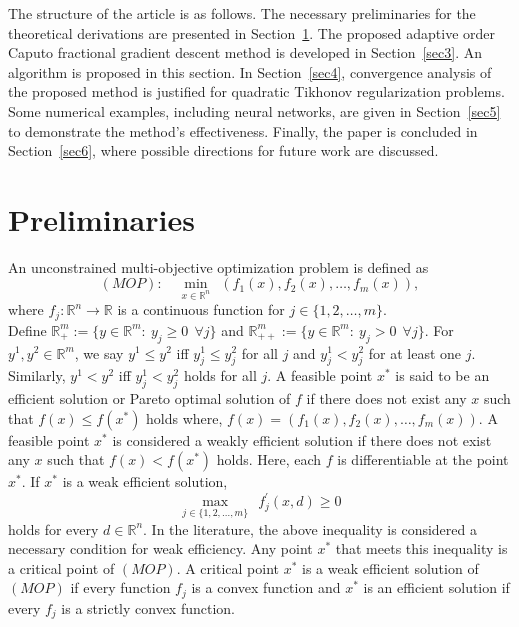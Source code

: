 \documentclass[smallextended,referee,envcountsect]{svjour3}
\begin{document}
The structure of the article is as follows. The necessary preliminaries for the theoretical derivations are presented in Section~\ref{sec2}. The proposed adaptive order Caputo fractional gradient descent method is developed in Section~\ref{sec3}. An algorithm is proposed in this section. In Section~\ref{sec4}, convergence analysis of the proposed method is justified for quadratic Tikhonov regularization problems. Some numerical examples, including neural networks, are given in Section~\ref{sec5} to demonstrate the method's effectiveness. Finally, the paper is concluded in Section~\ref{sec6}, where possible directions for future work are discussed.
\section{Preliminaries}\label{sec2}
 An unconstrained multi-objective optimization problem is defined as
\begin{equation*}
(MOP): \quad \underset{x\in \mathbb{R}^n}{\min} ~~(f_1(x), f_2(x), \dots, f_m(x)),
\end{equation*}
where $f_j:\mathbb{R}^n \rightarrow\mathbb{R}$ is a continuous function for $j \in \{1,2,\dots,m\}$.\\
Define $\mathbb{R}^m_{+}:=\{y\in \mathbb{R}^m:~y_j\geq 0~~\forall j\}$ and $\mathbb{R}^m_{++}:=\{y\in \mathbb{R}^m:~y_j> 0~~\forall j\}$. For $y^1,y^2\in\mathbb{R}^m$, we say $y^1\leq y^2$ iff $y^1_j\leq y^2_j$ for all $j$ and  $y^1_j< y^2_j$ for at least one $j$. Similarly, $y^1<y^2$ iff $y^1_j <y^2_j$ holds for all $j$. A feasible point $x^*$ is said to be an efficient solution or Pareto optimal solution of $f$ if there does not exist any $x$ such that $f(x)\leq f(x^*)$ holds where, $f(x)=(f_1(x), f_2(x), \dots, f_m(x))$. A feasible point $x^*$ is considered a weakly efficient solution if there does not exist any $x$ such that $f(x)<f(x^*)$ holds. Here, each $f$ is differentiable at the point $x^*$. If $x^*$ is a weak efficient solution,
\begin{equation}
   \underset{j\in\{1,2,\dots,m\}}{\max}~~ f_j^{\prime}(x,d)\geq 0 \label{crit1}
\end{equation}
holds for every $d\in\mathbb{R}^n$. In the literature, the above inequality is considered a necessary condition for weak efficiency. Any point $x^*$ that meets this inequality is a critical point of $(MOP)$. A critical point $x^*$ is a weak efficient solution of $(MOP)$ if every function $f_j$ is a convex function and $x^*$ is an efficient solution if every  $f_j$ is a strictly convex function.
 
\end{document}
